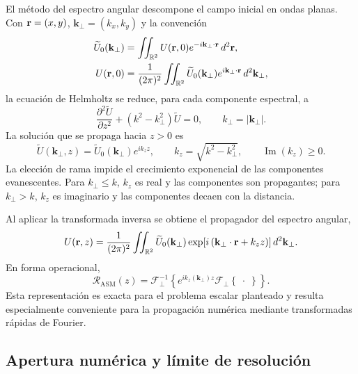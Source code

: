 El método del espectro angular descompone el campo inicial en ondas planas. Con
\(\vb r=(x,y)\), \(\mathbf k_\perp=(k_x,k_y)\) y la convención
\begin{align}
\widetilde U_0(\mathbf k_\perp)
&=
\iint_{\mathbb R^2}
U(\vb r,0)
e^{-i\mathbf k_\perp\cdot\vb r}\,
d^2\vb r,
\\
U(\vb r,0)
&=
\frac{1}{(2\pi)^2}
\iint_{\mathbb R^2}
\widetilde U_0(\mathbf k_\perp)
e^{i\mathbf k_\perp\cdot\vb r}\,
d^2\mathbf k_\perp,
\end{align}
la ecuación de Helmholtz se reduce, para cada componente espectral, a
\begin{equation}
\frac{\partial^2\widetilde U}{\partial z^2}
+
\left(k^2-k_\perp^2\right)\widetilde U=0,
\qquad
k_\perp=\lvert\mathbf k_\perp\rvert.
\end{equation}
La solución que se propaga hacia \(z>0\) es
\begin{equation}
\widetilde U(\mathbf k_\perp,z)
=
\widetilde U_0(\mathbf k_\perp)e^{ik_z z},
\qquad
k_z=\sqrt{k^2-k_\perp^2},
\qquad
\operatorname{Im}(k_z)\geq0.
\end{equation}
La elección de rama impide el crecimiento exponencial de las componentes
evanescentes. Para \(k_\perp\leq k\), \(k_z\) es real y las componentes son
propagantes; para \(k_\perp>k\), \(k_z\) es imaginario y las componentes
decaen con la distancia.

Al aplicar la transformada inversa se obtiene el propagador del espectro
angular,
\begin{equation}
U(\vb r,z)
=
\frac{1}{(2\pi)^2}
\iint_{\mathbb R^2}
\widetilde U_0(\mathbf k_\perp)
\exp\!\left[
i\left(
\mathbf k_\perp\cdot\vb r
+k_z z
\right)
\right]
d^2\mathbf k_\perp.
\label{eq:angular_spectrum_propagation}
\end{equation}
En forma operacional,
\begin{equation}
\mathscr R_{\mathrm{ASM}}(z)
=
\mathscr F_\perp^{-1}
\left\{
e^{ik_z(\mathbf k_\perp)z}
\mathscr F_\perp\left\{\;\cdot\;\right\}
\right\}.
\label{eq:propagation_operator}
\end{equation}
Esta representación es exacta para el problema escalar planteado y resulta
especialmente conveniente para la propagación numérica mediante transformadas
rápidas de Fourier.

\subsection{Apertura numérica y límite de resolución}
\label{sec:resolution_limit}

